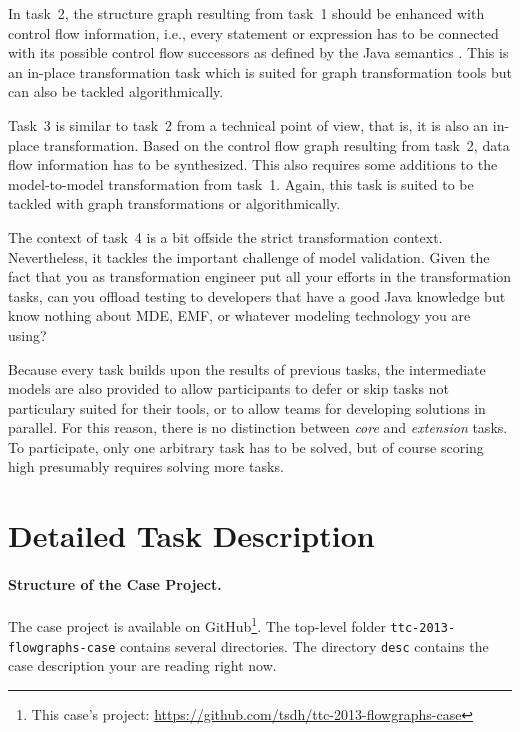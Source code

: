 \documentclass[submission,copyright,creativecommons]{eptcs}
\begin{document}
In task~2, the structure graph resulting from task~1 should be enhanced with
control flow information, i.e., every statement or expression has to be
connected with its possible control flow successors as defined by the Java
semantics \cite{Java7Spec}.  This is an in-place transformation task which is
suited for graph transformation tools but can also be tackled algorithmically.

Task~3 is similar to task~2 from a technical point of view, that is, it is also
an in-place transformation.  Based on the control flow graph resulting from
task~2, data flow information has to be synthesized.  This also requires some
additions to the model-to-model transformation from task~1.  Again, this task
is suited to be tackled with graph transformations or algorithmically.

The context of task~4 is a bit offside the strict transformation context.
Nevertheless, it tackles the important challenge of model validation.  Given
the fact that you as transformation engineer put all your efforts in the
transformation tasks, can you offload testing to developers that have a good
Java knowledge but know nothing about MDE, EMF, or whatever modeling technology
you are using?

Because every task builds upon the results of previous tasks, the intermediate
models are also provided to allow participants to defer or skip tasks not
particulary suited for their tools, or to allow teams for developing solutions
in parallel.  For this reason, there is no distinction between \emph{core} and
\emph{extension} tasks.  To participate, only one arbitrary task has to be
solved, but of course scoring high presumably requires solving more tasks.


\section{Detailed Task Description}
\label{sec:task-descr}

\paragraph{Structure of the Case Project.}

The case project is available on GitHub\footnote{This case's project:
  \url{https://github.com/tsdh/ttc-2013-flowgraphs-case}}. The top-level folder
\verb|ttc-2013-flowgraphs-case| contains several directories.  The directory
\verb|desc| contains the case description your are reading right now.
\end{document}
